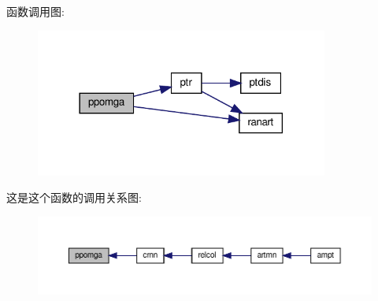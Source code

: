 函数调用图\+:
\nopagebreak
\begin{figure}[H]
\begin{center}
\leavevmode
\includegraphics[width=273pt]{ppomga_8f90_a51fc7720dec1c7e86ba7a347b800f49d_cgraph}
\end{center}
\end{figure}
这是这个函数的调用关系图\+:
\nopagebreak
\begin{figure}[H]
\begin{center}
\leavevmode
\includegraphics[width=350pt]{ppomga_8f90_a51fc7720dec1c7e86ba7a347b800f49d_icgraph}
\end{center}
\end{figure}
